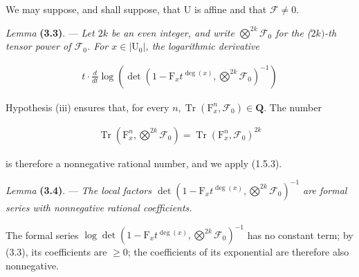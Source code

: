 \documentclass[10pt,leqno]{article}
\begin{document}
\par

\noindent We may suppose, and shall suppose, that \(\mathrm{U}\) is affine and that \(\mathcal{F} \ne 0\).\par

\noindent \emph{Lemma} \textbf{(3.3)}. — {\itshape Let \(2k\) be an even integer, and write \(\bigotimes\limits^{2k}\mathcal{F} _{0}\) for the (\(2k)\)-th tensor power of \(\mathcal{F} _{0}\). For \(x\in |\mathrm{U}_{0}|\), the logarithmic derivative}\par

\begin{equation*}\begin{gathered}t\cdot \frac{d}{dt} \operatorname{log}(\operatorname{det}(1- \mathrm{F}_{x} t^{\operatorname{deg}(x)},\bigotimes\limits^{2k}\mathcal{F} _{0})^{- 1})\end{gathered}\end{equation*}

\par

\noindent Hypothesis (iii) ensures that, for every \(n, \operatorname{Tr}(\mathrm{F}_{x}^{n},\mathcal{F} _{0})\in \mathbf{Q}\). The number\par

\begin{equation*}\begin{gathered}\operatorname{Tr}(\mathrm{F}_{x}^{n},\bigotimes\limits^{2k}\mathcal{F} _{0}) = \operatorname{Tr}(\mathrm{F}_{x}^{n},\mathcal{F} _{0})^{2k}\end{gathered}\end{equation*}

\noindent is therefore a nonnegative rational number, and we apply (1.5.3).\par

\noindent \emph{Lemma} \textbf{(3.4)}. — {\itshape The local factors \(\operatorname{det}(1- \mathrm{F}_{x} t^{\operatorname{deg}(x)},\bigotimes\limits^{2k}\mathcal{F} _{0})^{- 1}\) are formal series with nonnegative rational coefficients.}\par

\noindent The formal series \(\operatorname{log} \operatorname{det}(1- \mathrm{F}_{x} t^{\operatorname{deg}(x)},\bigotimes\limits^{2k}\mathcal{F} _{0})^{- 1}\) has no constant term; by (3.3), its coefficients are \(\geq 0\); the coefficients of its exponential are therefore also nonnegative.\par
\end{document}
